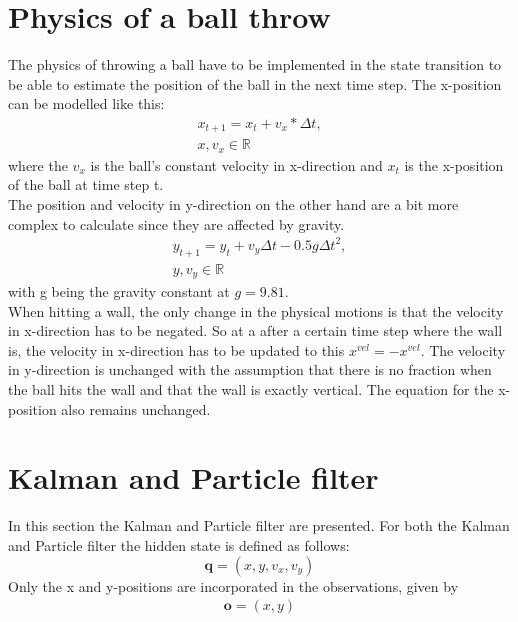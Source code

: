 \documentclass[conference]{IEEEtran}
\begin{document}
\section{Physics of a ball throw}
The physics of throwing a ball have to be implemented in the state transition to be able to estimate the position of the ball in the next time step.  
The x-position can be modelled like this:
\begin{equation*}
    \begin{aligned}
    x_{t+1} = x_{t} + v_x * \Delta t,   \\
    x, v_x \in \mathbb{R}
    \end{aligned}
    \tag{1}
\end{equation*}
where the ${v_x}$ is the ball's constant velocity in x-direction and $x_t$ is the x-position of the ball at time step t. \\
The position and velocity in y-direction on the other hand are a bit more complex to calculate since they are affected by gravity.
\begin{equation*}
    \begin{aligned}
    y_{t+1} = y_t + v_y \Delta t - 0.5 g \Delta t^2, \\
    y, v_y \in \mathbb{R}
    \end{aligned}
    \tag{2}
\end{equation*}
with g being the gravity constant at $g = 9.81$. \\
When hitting a wall, the only change in the physical motions is that the velocity in x-direction has to be negated.
So at a after a certain time step where the wall is, the velocity in x-direction has to be updated to this $x^{vel} = -x^{vel}$.
The velocity in y-direction is unchanged with the assumption that there is no fraction when the ball hits the wall and that the wall is exactly vertical. 
The equation for the x-position also remains unchanged.


\section{Kalman and Particle filter}
In this section the Kalman and Particle filter are presented. 
For both the Kalman and Particle filter the hidden state is defined as follows:
\begin{equation*}
\textbf{q} = (x, y, v_x, v_y)   \tag{3}
\end{equation*}
Only the x and y-positions are incorporated in the observations, given by
\begin{equation*}
    \begin{aligned}
    \textbf{o} = (x, y)
    \end{aligned}
\tag{4}
\end{equation*}
\end{document}
